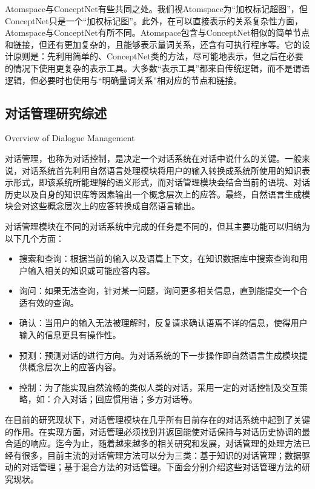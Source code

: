Atomspace与ConceptNet有些共同之处。我们视Atomspace为“加权标记超图”，但ConceptNet只是一个“加权标记图”。此外，在可以直接表示的关系复杂性方面，Atomspace与ConceptNet有所不同。Atomspace包含与ConceptNet相似的简单节点和链接，但还有更加复杂的，且能够表示量词关系，还含有可执行程序等。它的设计原则是：先利用简单的、ConceptNet类的方法，尽可能地表示，但之后在必要的情况下使用更复杂的表示工具。大多数“表示工具”都来自传统逻辑，而不是谓语逻辑，但必要时也使用与“明确量词关系”相对应的节点和链接。



\subsection{对话管理研究综述}{Overview of Dialogue Management}

对话管理，也称为对话控制，是决定一个对话系统在对话中说什么的关键。一般来说，对话系统首先利用自然语言处理模块将用户的输入转换成系统所使用的知识表示形式，即该系统所能理解的语义形式，而对话管理模块会结合当前的语境、对话历史以及自身的知识库等因素输出一个概念层次上的应答。最终，自然语言生成模块会对这些概念层次上的应答转换成自然语言输出。

对话管理模块在不同的对话系统中完成的任务是不同的，但其主要功能可以归纳为以下几个方面：

\begin{itemize}

\item 搜索和查询：根据当前的输入以及语篇上下文，在知识数据库中搜索查询和用户输入相关的知识或可能应答内容。
\item 询问：如果无法查询，针对某一问题，询问更多相关信息，直到能提交一个合适有效的查询。
\item 确认：当用户的输入无法被理解时，反复请求确认语焉不详的信息，使得用户输入的信息更具有操作性。
\item 预测：预测对话的进行方向。为对话系统的下一步操作即自然语言生成模块提供概念层次上的应答内容。
\item 控制：为了能实现自然流畅的类似人类的对话，采用一定的对话控制及交互策略，如：介入对话；回应惯用语；多方对话等。
\end{itemize}

在目前的研究现状下，对话管理模块在几乎所有目前存在的对话系统中起到了关键的作用。在实现方面，对话管理必须找到并返回能使对话保持与对话历史协调的最合适的响应。迄今为止，随着越来越多的相关研究和发展，对话管理的处理方法已经有很多，目前主流的对话管理方法可以分为三类：基于知识的对话管理；数据驱动的对话管理；基于混合方法的对话管理。下面会分别介绍这些对话管理方法的研究现状。

